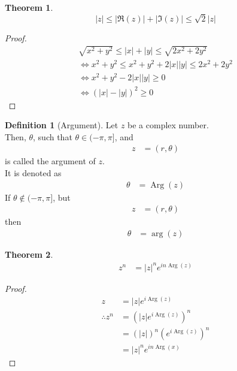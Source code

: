 \documentclass[titlepage, fleqn, a4paper, 12pt, twoside]{article}
\theoremstyle{definition}
\newtheorem{definition}{Definition}
\theoremstyle{theorem}
\newtheorem{theorem}{Theorem}
\DeclareMathOperator{\Arg}{Arg}
\begin{document}
\begin{theorem}
	\begin{equation*}
		|z| \le \left| \Re(z) \right| + \left| \Im(z) \right| \le \sqrt{2} |z|
	\end{equation*}
\end{theorem}

\begin{proof}
	\begin{gather*}
		\sqrt{x^2 + y^2} \le |x| + |y| \le \sqrt{2 x^2 + 2 y^2}\\
		\iff x^2 + y^2 \le x^2 + y^2 + 2 |x| |y| \le 2 x^2 + 2 y^2\\
		\iff x^2 + y^2 - 2 |x| |y| \ge 0\\
		\iff \left( |x| - |y| \right)^2 \ge 0
	\end{gather*}
\end{proof}

\begin{definition}[Argument]
	Let $z$ be a complex number.\\
Then, $\theta$, such that $\theta \in (-\pi,\pi]$, and
	\begin{align*}
		z & = (r,\theta)
	\end{align*}
	is called the argument of $z$.\\
	It is denoted as
	\begin{align*}
		\theta & = \Arg(z)
	\end{align*}
	If $\theta \notin (-\pi,\pi]$, but
	\begin{align*}
		z & = (r,\theta)
	\end{align*}
	then
	\begin{align*}
		\theta & = \arg(z)
	\end{align*}
\end{definition}

\begin{theorem}
	\begin{align*}
		z^n & = |z|^n e^{i n \Arg(z)}
	\end{align*}
\end{theorem}

\begin{proof}
	\begin{align*}
		z              & = |z| e^{i \Arg(z)}                                   \\
		\therefore z^n & = \left( |z| e^{i \Arg(z)} \right)^n                  \\
                               & = \left( |z| \right)^n \left( e^{i \Arg(z)} \right)^n \\
                               & = |z|^n e^{i n \Arg(x)}
	\end{align*}
\end{proof}
\end{document}
